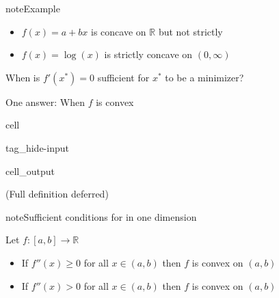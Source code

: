 \documentclass[letterpaper,10pt,english]{jupyterBook}
\begin{document}
\begin{sphinxadmonition}{note}{Example}
\begin{itemize}
\item {} 
\sphinxAtStartPar
\(f(x) = a + b x\) is concave on \(\mathbb{R}\) but not strictly

\item {} 
\sphinxAtStartPar
\(f(x) = \log(x)\) is strictly concave on \((0, \infty)\)

\end{itemize}
\end{sphinxadmonition}

\sphinxAtStartPar
When is \(f'(x^*) = 0\) sufficient for \(x^*\) to be a minimizer?

\sphinxAtStartPar
One answer: When \(f\) is convex

\begin{sphinxuseclass}{cell}
\begin{sphinxuseclass}{tag_hide-input}\begin{sphinxVerbatimOutput}

\begin{sphinxuseclass}{cell_output}

\end{sphinxuseclass}\end{sphinxVerbatimOutput}

\end{sphinxuseclass}
\end{sphinxuseclass}
\sphinxAtStartPar
(Full definition deferred)

\begin{sphinxadmonition}{note}{Sufficient conditions for  in one dimension}

\sphinxAtStartPar
Let \(f \colon [a, b] \to \mathbb{R}\)
\begin{itemize}
\item {} 
\sphinxAtStartPar
If \(f''(x) \geq 0\) for all \(x \in (a, b)\) then \(f\) is convex on \((a, b)\)

\item {} 
\sphinxAtStartPar
If \(f''(x) > 0\) for all \(x \in (a, b)\) then \(f\) is 
convex on \((a, b)\)

\end{itemize}
\end{sphinxadmonition}
\end{document}
